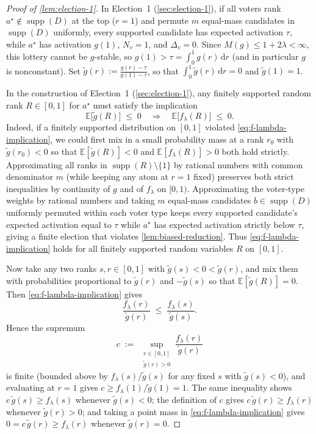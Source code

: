 \documentclass[11pt]{article}
\numberwithin{equation}{section}
\theoremstyle{plain}
\theoremstyle{definition}
\newcommand{\E}{\mathbb{E}}
\newcommand{\1}{\mathbf{1}}
\newcommand{\supp}{\operatorname{supp}}
\begin{document}
\begin{proof}[Proof of {\cref{lem:election-1}}]
In Election~1 (\cref{sec:election-1}), if all voters rank $a^\star \notin \supp(D)$ at the top ($r = 1$) and permute $m$ equal-mass candidates in $\supp(D)$ uniformly, every supported candidate has expected activation $\tau$, while $a^\star$ has activation $g(1)$, $N_v = 1$, and $\Delta_v = 0$. Since $M(g) \le 1 + 2\lambda < \infty$, this lottery cannot be $g$-stable, so $g(1) > \tau = \int_0^1 g(r)\,\mathrm{d}r$ (and in particular $g$ is nonconstant). Set $\widetilde{g}(r) := \frac{g(r) - \tau}{g(1) - \tau}$, so that $\int_0^1 \widetilde{g}(r)\,\mathrm{d}r = 0$ and $\widetilde{g}(1) = 1$.

In the construction of Election~1 (\cref{sec:election-1}), any finitely supported random rank $R \in [0, 1]$ for $a^\star$ must satisfy the implication
\begin{equation}
  \E\bigl[\widetilde{g}(R)\bigr] \;\le\; 0 \quad\Longrightarrow\quad \E\bigl[f_\lambda(R)\bigr] \;\le\; 0.
  \label{eq:f-lambda-implication}
\end{equation}
Indeed, if a finitely supported distribution on $[0, 1]$ violated \cref{eq:f-lambda-implication}, we could first mix in a small probability mass at a rank $r_0$ with $\widetilde{g}(r_0) < 0$ so that $\E[\widetilde{g}(R)] < 0$ and $\E[f_\lambda(R)] > 0$ both hold strictly. Approximating all ranks in $\supp(R) \setminus \{1\}$ by rational numbers with common denominator $m$ (while keeping any atom at $r = 1$ fixed) preserves both strict inequalities by continuity of $g$ and of $f_\lambda$ on $[0, 1)$. Approximating the voter-type weights by rational numbers and taking $m$ equal-mass candidates $b \in \supp(D)$ uniformly permuted within each voter type keeps every supported candidate's expected activation equal to $\tau$ while $a^\star$ has expected activation strictly below $\tau$, giving a finite election that violates \cref{lem:biased-reduction}. Thus \cref{eq:f-lambda-implication} holds for all finitely supported random variables $R$ on $[0, 1]$.

Now take any two ranks $s, r \in [0, 1]$ with $\widetilde{g}(s) < 0 < \widetilde{g}(r)$, and mix them with probabilities proportional to $\widetilde{g}(r)$ and $-\widetilde{g}(s)$ so that $\E[\widetilde{g}(R)] = 0$. Then \cref{eq:f-lambda-implication} gives
\[
  \frac{f_\lambda(r)}{\widetilde{g}(r)} \;\le\; \frac{f_\lambda(s)}{\widetilde{g}(s)}.
\]
Hence the supremum
\[
  c \;:=\; \sup_{\substack{r \in [0, 1] \\ \widetilde{g}(r) > 0}} \frac{f_\lambda(r)}{\widetilde{g}(r)}
\]
is finite (bounded above by $f_\lambda(s)/\widetilde{g}(s)$ for any fixed $s$ with $\widetilde{g}(s) < 0$), and evaluating at $r = 1$ gives $c \ge f_\lambda(1)/\widetilde{g}(1) = 1$. The same inequality shows $c\,\widetilde{g}(s) \ge f_\lambda(s)$ whenever $\widetilde{g}(s) < 0$; the definition of $c$ gives $c\,\widetilde{g}(r) \ge f_\lambda(r)$ whenever $\widetilde{g}(r) > 0$; and taking a point mass in \cref{eq:f-lambda-implication} gives $0 = c\,\widetilde{g}(r) \ge f_\lambda(r)$ whenever $\widetilde{g}(r) = 0$.


\end{proof}
\end{document}
